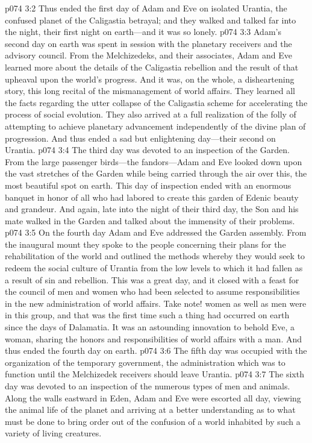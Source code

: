\vs p074 3:2 Thus ended the first day of Adam and Eve on isolated Urantia, the confused planet of the Caligastia betrayal; and they walked and talked far into the night, their first night on earth---and it was so lonely.
\pc \vs p074 3:3 Adam’s second day on earth was spent in session with the planetary receivers and the advisory council. From the Melchizedeks, and their associates, Adam and Eve learned more about the details of the Caligastia rebellion and the result of that upheaval upon the world’s progress. And it was, on the whole, a disheartening story, this long recital of the mismanagement of world affairs. They learned all the facts regarding the utter collapse of the Caligastia scheme for accelerating the process of social evolution. They also arrived at a full realization of the folly of attempting to achieve planetary advancement independently of the divine plan of progression. And thus ended a sad but enlightening day---their second on Urantia.
\pc \vs p074 3:4 The third day was devoted to an inspection of the Garden. From the large passenger birds---the fandors---Adam and Eve looked down upon the vast stretches of the Garden while being carried through the air over this, the most beautiful spot on earth. This day of inspection ended with an enormous banquet in honor of all who had labored to create this garden of Edenic beauty and grandeur. And again, late into the night of their third day, the Son and his mate walked in the Garden and talked about the immensity of their problems.\plusone
\pc \vs p074 3:5 On the fourth day Adam and Eve addressed the Garden assembly. From the inaugural mount they spoke to the people concerning their plans for the rehabilitation of the world and outlined the methods whereby they would seek to redeem the social culture of Urantia from the low levels to which it had fallen as a result of sin and rebellion. This was a great day, and it closed with a feast for the council of men and women who had been selected to assume responsibilities in the new administration of world affairs. Take note! women as well as men were in this group, and that was the first time such a thing had occurred on earth since the days of Dalamatia. It was an astounding innovation to behold Eve, a woman, sharing the honors and responsibilities of world affairs with a man. And thus ended the fourth day on earth.\plusone
\pc \vs p074 3:6 The fifth day was occupied with the organization of the temporary government, the administration which was to function until the Melchizedek receivers should leave Urantia.
\pc \vs p074 3:7 The sixth day was devoted to an inspection of the numerous types of men and animals. Along the walls eastward in Eden, Adam and Eve were escorted all day, viewing the animal life of the planet and arriving at a better understanding as to what must be done to bring order out of the confusion of a world inhabited by such a variety of living creatures.
